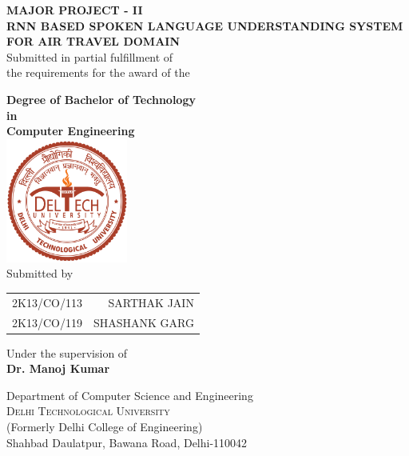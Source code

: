 \begin{titlepage}

\begin{center}

\textup{ {\bf MAJOR PROJECT - II}}\\[0.2in]

\Large \textbf {RNN BASED SPOKEN LANGUAGE UNDERSTANDING SYSTEM FOR AIR TRAVEL DOMAIN}\\[0.5in]

       \normalsize {Submitted in partial fulfillment of\\
        the requirements for the award of the}
        \vspace{.2in}

       {\bf\large Degree of Bachelor of Technology \\in\\ Computer Engineering}\\[0.5in]

\includegraphics[width=0.3\textwidth]{logo.png}\\[0.1in]
\vspace{.2in}
\normalsize Submitted by \\
\begin{table}[h]
\centering
\begin{tabular}{lr}

2K13/CO/113 & SARTHAK JAIN \\
2K13/CO/119 & SHASHANK GARG \\ 
\end{tabular}
\end{table}

\vspace{.2in}
Under the supervision of\\
{\textbf{Dr. Manoj Kumar}}\\[0.2in]

\vfill


\large{Department of Computer Science and Engineering}\\
\normalsize
\textsc{\Large Delhi Technological University}\\
(Formerly Delhi College of Engineering) \\
Shahbad Daulatpur, Bawana Road, Delhi-110042
\vspace{0.2cm}

\end{center}

\end{titlepage}

